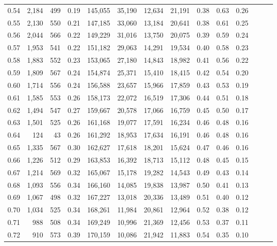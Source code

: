 \begin{tabular}{rrrrrrrrrrrrrr}
0.54 &  2,184 &  499 &  0.19 &  145,055 &   35,190 &  12,634 &  21,191 &  0.38 &  0.63 &      0.26 \\
0.55 &  2,130 &  550 &  0.21 &  147,185 &   33,060 &  13,184 &  20,641 &  0.38 &  0.61 &      0.25 \\
0.56 &  2,044 &  566 &  0.22 &  149,229 &   31,016 &  13,750 &  20,075 &  0.39 &  0.59 &      0.24 \\
0.57 &  1,953 &  541 &  0.22 &  151,182 &   29,063 &  14,291 &  19,534 &  0.40 &  0.58 &      0.23 \\
0.58 &  1,883 &  552 &  0.23 &  153,065 &   27,180 &  14,843 &  18,982 &  0.41 &  0.56 &      0.22 \\
0.59 &  1,809 &  567 &  0.24 &  154,874 &   25,371 &  15,410 &  18,415 &  0.42 &  0.54 &      0.20 \\
0.60 &  1,714 &  556 &  0.24 &  156,588 &   23,657 &  15,966 &  17,859 &  0.43 &  0.53 &      0.19 \\
0.61 &  1,585 &  553 &  0.26 &  158,173 &   22,072 &  16,519 &  17,306 &  0.44 &  0.51 &      0.18 \\
0.62 &  1,494 &  547 &  0.27 &  159,667 &   20,578 &  17,066 &  16,759 &  0.45 &  0.50 &      0.17 \\
0.63 &  1,501 &  525 &  0.26 &  161,168 &   19,077 &  17,591 &  16,234 &  0.46 &  0.48 &      0.16 \\
0.64 &    124 &   43 &  0.26 &  161,292 &   18,953 &  17,634 &  16,191 &  0.46 &  0.48 &      0.16 \\
0.65 &  1,335 &  567 &  0.30 &  162,627 &   17,618 &  18,201 &  15,624 &  0.47 &  0.46 &      0.16 \\
0.66 &  1,226 &  512 &  0.29 &  163,853 &   16,392 &  18,713 &  15,112 &  0.48 &  0.45 &      0.15 \\
0.67 &  1,214 &  569 &  0.32 &  165,067 &   15,178 &  19,282 &  14,543 &  0.49 &  0.43 &      0.14 \\
0.68 &  1,093 &  556 &  0.34 &  166,160 &   14,085 &  19,838 &  13,987 &  0.50 &  0.41 &      0.13 \\
0.69 &  1,067 &  498 &  0.32 &  167,227 &   13,018 &  20,336 &  13,489 &  0.51 &  0.40 &      0.12 \\
0.70 &  1,034 &  525 &  0.34 &  168,261 &   11,984 &  20,861 &  12,964 &  0.52 &  0.38 &      0.12 \\
0.71 &    988 &  508 &  0.34 &  169,249 &   10,996 &  21,369 &  12,456 &  0.53 &  0.37 &      0.11 \\
0.72 &    910 &  573 &  0.39 &  170,159 &   10,086 &  21,942 &  11,883 &  0.54 &  0.35 &      0.10 \\

\end{tabular}
